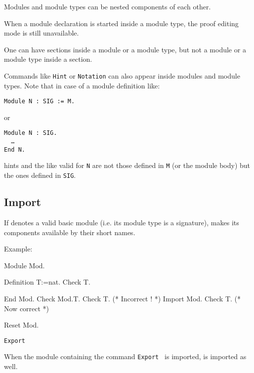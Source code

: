 \begin{Remarks}
\item Modules and module types can be nested components of each other.
\item When a module declaration is started inside a module type,
  the proof editing mode is still unavailable.
\item One can have sections inside a module or a module type, but
  not a module or a module type inside a section.
\item Commands like \texttt{Hint} or \texttt{Notation} can
  also appear inside modules and module types. Note that in case of a
  module definition like:

    \medskip
    \noindent
    {\tt Module N : SIG := M.} 
    \medskip

    or

    \medskip
    {\tt Module N : SIG.\\
      \ \ \dots\\
      End N.}
    \medskip 
    
    hints and the like valid for \texttt{N} are not those defined in
    \texttt{M} (or the module body) but the ones defined in
    \texttt{SIG}.

\end{Remarks}

\subsection{Import {\qualid}
\label{Import}}

If {\qualid} denotes a valid basic module (i.e. its module type is a
signature), makes its components available by their short names.

Example:

\begin{coq_example}
Module Mod.
\end{coq_example}
\begin{coq_example}
  Definition T:=nat.
  Check T.
\end{coq_example}
\begin{coq_example}
End Mod.
Check Mod.T.
Check T. (* Incorrect ! *)
Import Mod.
Check T. (* Now correct *)
\end{coq_example}
\begin{coq_eval}
Reset Mod.
\end{coq_eval}


\begin{Variants}
\item{\tt Export {\qualid}}

  When the module containing the command {\tt Export {\qualid}} is
  imported, {\qualid} is imported as well.
\end{Variants}

